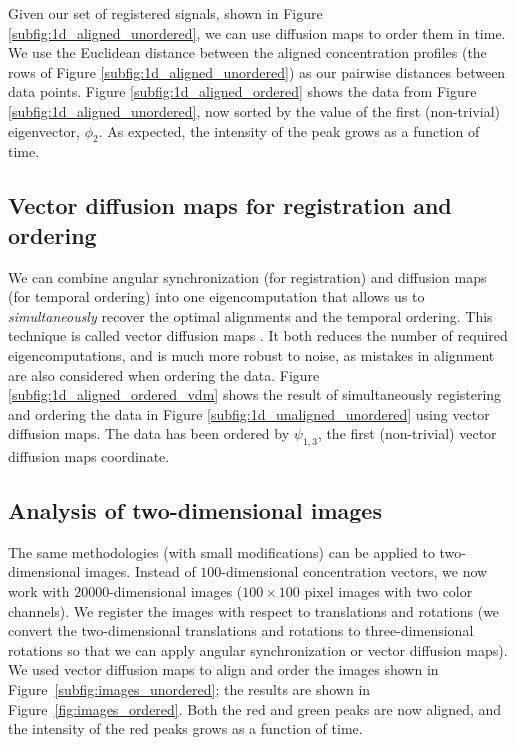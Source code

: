 \documentclass{pnastwo}
\begin{document}
\begin{article}
Given our set of registered signals, shown in Figure \ref{subfig:1d_aligned_unordered}, we can use diffusion maps to order them in time.
%
We use the Euclidean distance between the aligned concentration profiles (the rows of Figure \ref{subfig:1d_aligned_unordered}) as our pairwise distances between data points.
%
Figure \ref{subfig:1d_aligned_ordered} shows the data from Figure \ref{subfig:1d_aligned_unordered}, now sorted by the value of the first (non-trivial) eigenvector, $\phi_2$. 
%
As expected, the intensity of the peak grows as a function of time. 
%
%

\subsection{Vector diffusion maps for registration and ordering}

%
%
We can combine angular synchronization (for registration) and diffusion maps (for temporal ordering) into one eigencomputation that allows us to {\em simultaneously} recover the optimal alignments and the temporal ordering.
%
This technique is called vector diffusion maps \cite{singer2012vector}.
%
It both reduces the number of required eigencomputations, and is much more robust to noise, as mistakes in alignment are also considered when ordering the data.
%
Figure \ref{subfig:1d_aligned_ordered_vdm} shows the result of simultaneously registering and ordering the data in Figure \ref{subfig:1d_unaligned_unordered} using vector diffusion maps. 
%
The data has been ordered by $\psi_{1, 3}$, the first (non-trivial) vector diffusion maps coordinate. 

\subsection{Analysis of two-dimensional images}

The same methodologies (with small modifications) can be applied to two-dimensional images.
%
Instead of $100$-dimensional concentration vectors, we now work with $20000$-dimensional images ($100 \times 100$ pixel images with two color channels).
%
We register the images with respect to translations and rotations 
(we convert the two-dimensional translations and rotations to three-dimensional rotations so that we can apply angular synchronization or vector diffusion maps). 
%
We used vector diffusion maps to align and order the images shown in Figure~\ref{subfig:images_unordered};
the results are shown in Figure~\ref{fig:images_ordered}.
%
Both the red and green peaks are now aligned, and the intensity of the red peaks grows as a function of time.


\end{article}
\end{document}
